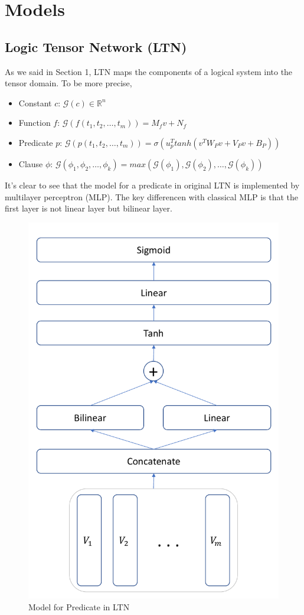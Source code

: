 
\section{Models}

\subsection{Logic Tensor Network (LTN)}

As we said in Section 1, LTN maps the components of a logical system into the tensor domain. To be more precise,

\begin{itemize}
    \item Constant $c$: $\mathcal{G}(c) \in \mathbb{R}^n$
    \item Function $f$: $\mathcal{G}(f(t_1,t_2,\dots,t_m))=M_f v+N_f$
    \item Predicate $p$: $\mathcal{G}(p(t_1,t_2,\dots,t_m))=\sigma(u_p^T tanh(v^{T} W_{P} v +V_Pv+B_P))$
    \item Clause $\phi$: $\mathcal{G}(\phi_1, \phi_2, \dots, \phi_k)=max(\mathcal{G}(\phi_1),\mathcal{G}(\phi_2),\dots,\mathcal{G}(\phi_k))$
\end{itemize}

It's clear to see that the model for a predicate in original LTN is implemented by multilayer perceptron (MLP). The key differencen with classical MLP is that the first layer is not linear layer but bilinear layer.

\begin{figure}
    \centering
    \includegraphics[width=.4\textwidth]{img/Predicate.pdf}
    \caption{Model for Predicate in LTN}
    \label{fig:LTN_predicate}
\end{figure}

